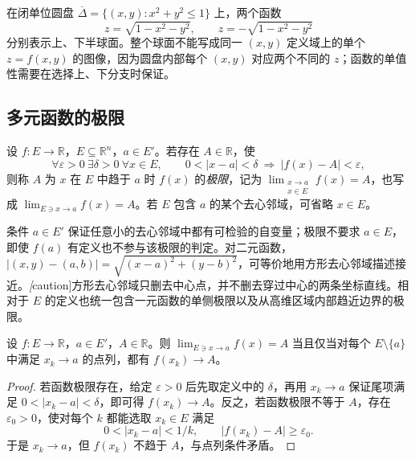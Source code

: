 \begin{solve}
在闭单位圆盘 $\overline\Delta=\{(x,y):x^2+y^2\leq1\}$ 上，两个函数
\[
    z=\sqrt{1-x^2-y^2},\qquad z=-\sqrt{1-x^2-y^2}
\]
分别表示上、下半球面。整个球面不能写成同一 $(x,y)$ 定义域上的单个 $z=f(x,y)$ 的图像，因为圆盘内部每个 $(x,y)$ 对应两个不同的 $z$；函数的单值性需要在选择上、下分支时保证。
\end{solve}

\subsection{多元函数的极限}
\label{subsec:limits-of-multivariable-functions}

\begin{definition}
\label{def:multivariable-function-limit}
设 $f:E\to\mathbb R$，$E\subseteq\mathbb R^n$，$a\in E'$。若存在 $A\in\mathbb R$，使
\[
    \forall\varepsilon>0\ \exists\delta>0\ \forall x\in E,
    \qquad 0<|x-a|<\delta\ \Longrightarrow\ |f(x)-A|<\varepsilon,
\]
则称 $A$ 为 $x$ 在 $E$ 中趋于 $a$ 时 $f(x)$ 的\emph{极限}，记为 $\lim_{\substack{x\to a\\ x\in E}}f(x)=A$，也写成 $\lim_{E\ni x\to a}f(x)=A$。若 $E$ 包含 $a$ 的某个去心邻域，可省略 $x\in E$。
\end{definition}

条件 $a\in E'$ 保证任意小的去心邻域中都有可检验的自变量；极限不要求 $a\in E$，即使 $f(a)$ 有定义也不参与该极限的判定。对二元函数，$|(x,y)-(a,b)|=\sqrt{(x-a)^2+(y-b)^2}$，可等价地用方形去心邻域描述接近。\emph[caution]{方形去心邻域只删去中心点，并不删去穿过中心的两条坐标直线。}相对于 $E$ 的定义也统一包含一元函数的单侧极限以及从高维区域内部趋近边界的极限。

\begin{theorem}[多元函数极限的点列准则]
\label{thm:multivariable-heine-criterion}
设 $f:E\to\mathbb R$，$a\in E'$，$A\in\mathbb R$。则 $\lim_{E\ni x\to a}f(x)=A$ 当且仅当对每个 $E\setminus\{a\}$ 中满足 $x_k\to a$ 的点列，都有 $f(x_k)\to A$。
\end{theorem}

\begin{proof}
若函数极限存在，给定 $\varepsilon>0$ 后先取定义中的 $\delta$，再用 $x_k\to a$ 保证尾项满足 $0<|x_k-a|<\delta$，即可得 $f(x_k)\to A$。反之，若函数极限不等于 $A$，存在 $\varepsilon_0>0$，使对每个 $k$ 都能选取 $x_k\in E$ 满足
\[
    0<|x_k-a|<1/k,\qquad |f(x_k)-A|\geq\varepsilon_0.
\]
于是 $x_k\to a$，但 $f(x_k)$ 不趋于 $A$，与点列条件矛盾。
\end{proof}

